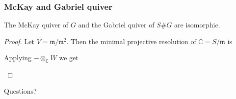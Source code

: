 \documentclass[screen, aspectratio=43]{beamer}
\theoremstyle{definition}
\newcommand{\C}{\mathbb{C}}
\begin{document}
\begin{frame}[fragile]
	\frametitle{McKay and Gabriel quiver}
	\begin{theorem}
		The McKay quiver of $G$ and the Gabriel quiver of $S\#G$ are isomorphic.
		\begin{proof}
		Let $V = \mathfrak{m}/\mathfrak{m}^2$. Then the minimal projective resolution of $\C = S / \mathfrak{m}$ is
		\begin{center}
		\end{center}
		Applying $- \otimes_\C W$ we get
		\begin{center}
		\end{center}
		\end{proof}
	\end{theorem}
\end{frame}

\begin{frame}
	\begin{center}  
	\vspace{2cm}
    \begingroup
      \fontsize{40pt}{12pt}\selectfont
      Questions? 
    \endgroup
  	\end{center}	
\end{frame}

\end{document}
